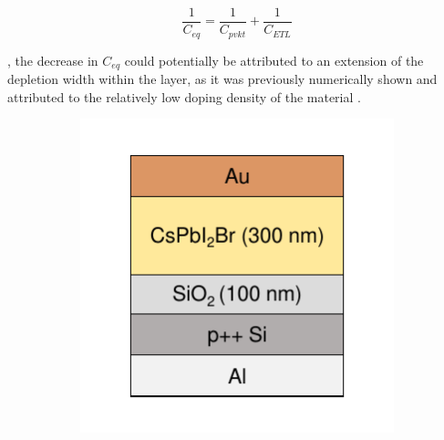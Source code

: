  \begin{equation}
    \frac{1}{C_{eq}} = \frac{1}{C_{pvkt}} + \frac{1}{C_{ETL}}
    \label{eg:series_cap}
 \end{equation}

, the decrease in $C_{eq}$ could potentially be attributed to an extension of the depletion width within the  layer, as it was previously numerically shown and attributed to the relatively low doping density of the material \cite{Pham2023EffectsCells}.  

\begin{figure}[htbp]
    \centering
    \begin{subfigure}[t]{0.4\textwidth} %
        \centering
        \includegraphics[width=\textwidth]{chapters/transport_layers/images/MOS_Structure_icon.pdf} %
        \caption{}
        \label{}
    \end{subfigure}
    \hspace{0.5cm}
    \begin{subfigure}[t]{0.4\textwidth} %
        \centering

\end{subfigure}
\end{figure}
